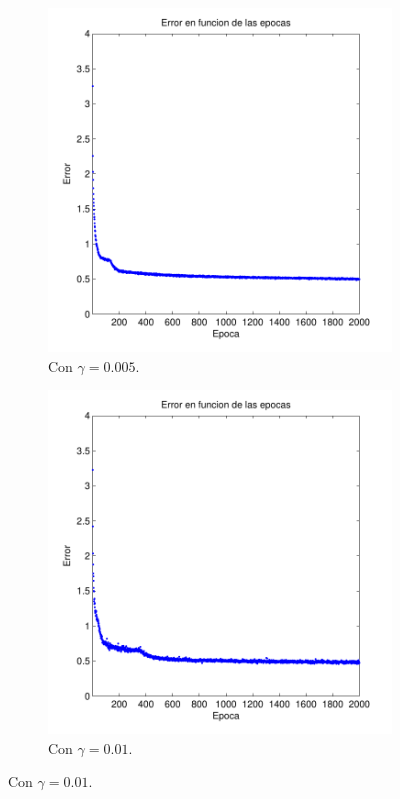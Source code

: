 \documentclass[informe.tex]{subfiles}
\begin{document}
    \begin{figure}[H]
        \centering
        \begin{subfigure}[b]{0.49\textwidth}
                \includegraphics[width=\textwidth]{graficos/error_fold2_20_binary-regresion_2000_0005.pdf}
                \caption{Con $\gamma=0.005$.}
                \label{fig:d2-f2-2k-0005-n20}
        \end{subfigure}
        \begin{subfigure}[b]{0.49\textwidth}
                \includegraphics[width=\textwidth]{graficos/error_fold2_20_binary-regresion_2000_001.pdf}
                \caption{Con $\gamma=0.01$.}
                \label{fig:d2-f2-2k-001-n20}
        \end{subfigure}
        

\end{figure}
\end{document}
